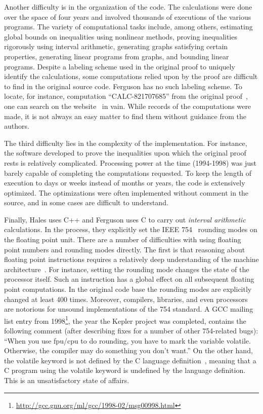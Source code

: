 \documentclass[11pt]{amsart}
\begin{document}
Another difficulty is in the organization of the code. The
calculations were done over the space of four years and involved 
thousands of executions of the various
programs. The variety of computational tasks include, among others,
estimating global bounds on inequalities using nonlinear methods,
proving inequalities rigorously using interval arithmetic, generating
graphs satisfying certain properties, generating linear programs from
graphs, and bounding linear programs. Despite a labeling scheme used
in the original proof to uniquely identify the calculations, some
computations relied upon by the proof are difficult to find in the
original source code.  Ferguson has no such labeling scheme.  To
locate, for instance, computation ``CALC-821707685'' from the original
proof~\cite[p.159]{Hales:2006:DCG}, one can search on the
website~\cite{website:Hales:1998:Code} in vain.  While records of the
computations were made, it is not always an easy matter to find them
without guidance from the authors.

The third difficulty lies in the complexity of the implementation. For
instance, the software developed to prove the inequalities upon which
the original proof rests is relatively complicated. Processing power
at the time (1994-1998) was just barely capable of completing the
computations requested. To keep the length of execution to days or
weeks instead of months or years, the code is extensively
optimized. The optimizations were often implemented without comment in
the source, and in some cases are difficult to understand.

Finally, Hales uses C++ and Ferguson uses C to carry out
\emph{interval arithmetic} calculations. In the process, they
explicitly set the IEEE 754~\cite{IEEE:1985:IEE754} rounding modes on
the floating point unit. There are a number of difficulties with using
floating point numbers and rounding modes directly. The first is that
reasoning about floating point instructions requires a relatively deep
understanding of the machine architecture~\cite{Monniaux:2008:TOPLAS}.
For instance, setting the rounding mode 
changes the state of the processor itself. Such an instruction has a
global effect on all subsequent floating point computations. 
In the original code base the rounding modes are explicitly changed at
least 400 times.  Moreover,
compilers, libraries, and even processors are notorious for unsound
implementations of the 754 standard. A GCC mailing list entry from
1998\footnote{\url{http://gcc.gnu.org/ml/gcc/1998-02/msg00998.html}},
the year the Kepler project was completed, contains the following
comment (after describing fixes for a number of other 754-related
bugs): ``When you use fpu/cpu to do rounding, you have to mark the
variable volatile. Otherwise, the compiler may do something  you don't
want.'' On the other hand, the volatile keyword is not defined by
the C language definition~\cite{Kernighan:1988:C}, meaning that a C
program using the volatile keyword is undefined by the
language definition. This is an unsatisfactory state of affairs.
\end{document}
